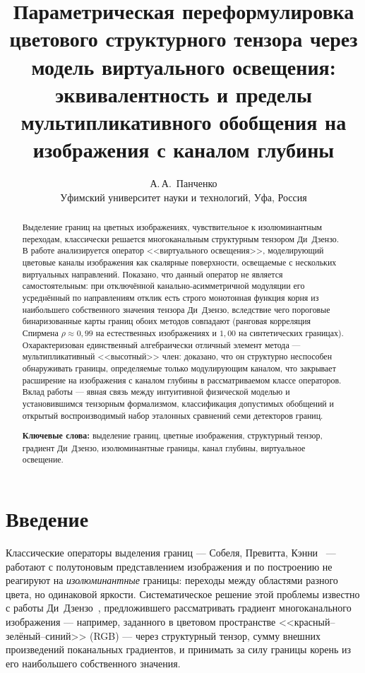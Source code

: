 \documentclass[11pt,a4paper]{article}
\title{Параметрическая переформулировка цветового структурного тензора
через модель виртуального освещения: эквивалентность и пределы
мультипликативного обобщения на изображения с каналом глубины}
\author{А.\,А.~Панченко\\
  \small Уфимский университет науки и технологий, Уфа, Россия
}
\date{}
\theoremstyle{plain}
\theoremstyle{definition}
\theoremstyle{remark}
\begin{document}
\maketitle

\begin{abstract}
Выделение границ на цветных изображениях, чувствительное к изолюминантным
переходам, классически решается многоканальным структурным тензором
Ди~Дзензо. В работе анализируется оператор <<виртуального освещения>>,
моделирующий цветовые каналы изображения как скалярные поверхности,
освещаемые с нескольких виртуальных направлений. Показано, что данный оператор не является
самостоятельным: при отключённой канально-асимметричной модуляции его
усреднённый по направлениям отклик есть строго монотонная функция корня из
наибольшего собственного значения тензора Ди~Дзензо, вследствие чего
пороговые бинаризованные карты границ обоих методов совпадают (ранговая
корреляция Спирмена $\rho \approx 0{,}99$ на естественных изображениях и
$1{,}00$ на синтетических границах). Охарактеризован единственный
алгебраически отличный элемент метода --- мультипликативный <<высотный>>
член: доказано, что он структурно неспособен обнаруживать границы,
определяемые только модулирующим каналом, что закрывает расширение на
изображения с каналом глубины в рассматриваемом классе операторов.
Вклад работы --- явная связь между интуитивной физической моделью и
установившимся тензорным формализмом, классификация допустимых обобщений
и открытый воспроизводимый набор эталонных сравнений семи детекторов
границ.

\medskip
\noindent\textbf{Ключевые слова:} выделение границ, цветные изображения,
структурный тензор, градиент Ди~Дзензо, изолюминантные границы, канал
глубины, виртуальное освещение.
\end{abstract}

\section{Введение}
\label{sec:intro}

Классические операторы выделения границ --- Собеля, Превитта,
Кэнни~\cite{canny1986} --- работают с полутоновым представлением изображения
и по построению не реагируют на \emph{изолюминантные} границы: переходы
между областями разного цвета, но одинаковой яркости. Систематическое
решение этой проблемы известно с работы Ди~Дзензо~\cite{dizenzo1986},
предложившего рассматривать градиент многоканального изображения ---
например, заданного в цветовом пространстве <<красный--зелёный--синий>>
(RGB) --- через структурный тензор, сумму внешних произведений поканальных
градиентов, и принимать за силу границы корень из его наибольшего
собственного значения.
\end{document}

